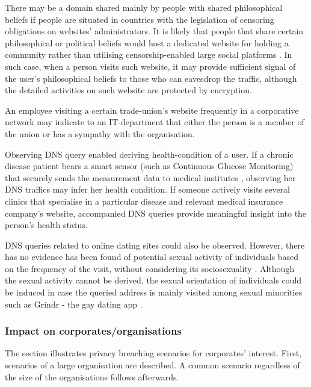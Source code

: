 There may be a domain shared mainly by people with shared philosophical beliefs if people are situated in countries with the legislation of censoring obligations on websites' administrators.
It is likely that people that share certain philosophical or political beliefs would host a dedicated website for holding a community rather than utilising censorship-enabled large social platforms \cite{mackinnon2009china}.
In such case, when a person visits such website, it may provide sufficient signal of the user's philosophical beliefs to those who can eavesdrop the traffic, although the detailed activities on such website are protected by encryption.

An employee visiting a certain trade-union's website frequently in a corporative network may indicate to an IT-department that either the person is a member of the union or has a sympathy with the organisation. 

Observing DNS query enabled deriving health-condition of a user. If a chronic disease patient bears a smart sensor (such as Continuous Glucose Monitoring) that securely sends the measurement data to medical institutes \cite{carelink-uploading, medtronic-watson}, observing her DNS traffics may infer her health condition.
If someone actively visits several clinics that specialise in a particular disease and relevant medical insurance company's website, accompanied DNS queries provide meaningful insight into the person's health status.

DNS queries related to online dating sites could also be observed. However, there has no evidence has been found of potential sexual activity of individuals based on the frequency of the visit, without considering its sociosexuality \cite{sevi2018exploring}. 
Although the sexual activity cannot be derived, the sexual orientation of individuals could be induced in case the queried address is mainly visited among sexual minorities such as Grindr - the gay dating app \cite{goedel2015geosocial}.

\subsubsection{Impact on corporates/organisations}
The section illustrates privacy breaching scenarios for corporates' interest. First, scenarios of a large organisation are described. A common scenario regardless of the size of the organisations follows afterwards.

